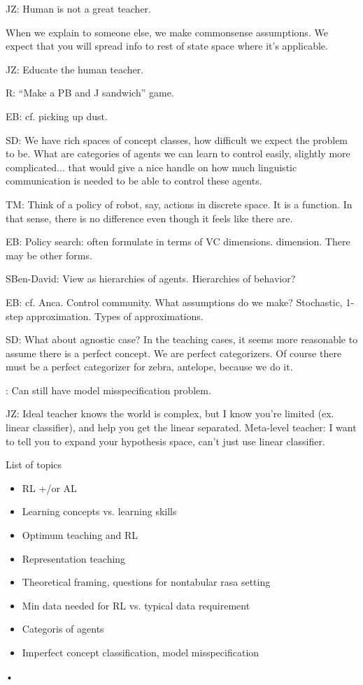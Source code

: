 JZ: Human is not a great teacher. 

When we explain to someone else, we make commonsense assumptions. We expect that you will spread info to rest of state space where it's applicable.

JZ: Educate the human teacher.

R: ``Make a PB and J sandwich'' game.

EB: cf. picking up dust.

SD: We have rich spaces of concept classes, how difficult we expect the problem to be. What are categories of agents we can learn to control easily, slightly more complicated... that would give a nice handle on how much linguistic communication is needed to be able to control these agents.

TM: Think of a policy of robot, say, actions in discrete space. It is a function. In that sense, there is no difference even though it feels like there are. 

EB: Policy search: often formulate in terms of VC dimensions. dimension. There may be other forms.

SBen-David: View as hierarchies of agents. Hierarchies of behavior?%

EB: cf. Anca. Control community. What assumptions do we make? Stochastic, 1-step approximation. Types of approximations.

SD: What about agnostic case? %
In the teaching cases, it seems more reasonable to assume there is a perfect concept. We are perfect categorizers. Of course there must be a perfect categorizer for zebra, antelope, because we do it.

: Can still have model misspecification problem. 

JZ: Ideal teacher knows the world is complex, but I know you're limited (ex. linear classifier), and help you get the linear separated. Meta-level teacher: I want to tell you to expand your hypothesis space, can't just use linear classifier.


List of topics
\begin{itemize}
\item RL +/or AL
\item
Learning concepts vs. learning skills
\item
Optimum teaching and RL
\item
Representation teaching
\item
Theoretical framing, questions for nontabular rasa setting
\item Min data needed for RL vs. typical data requirement
\item
Categoris of agents
\item
Imperfect concept classification, model misspecification
\end{itemize}•